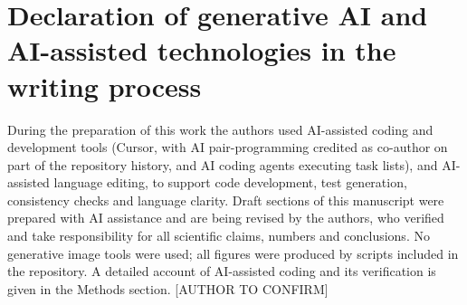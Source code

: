 
\section*{Declaration of generative AI and AI-assisted technologies in the writing process}

During the preparation of this work the authors used AI-assisted coding and
development tools (Cursor, with AI pair-programming credited as co-author on
part of the repository history, and AI coding agents executing task lists), and
AI-assisted language editing, to support code development, test generation,
consistency checks and language clarity. Draft sections of this manuscript were
prepared with AI assistance and are being revised by the authors, who verified
and take responsibility for all scientific claims, numbers and conclusions.
No generative image tools were used; all figures were produced by scripts
included in the repository. A detailed account of AI-assisted coding and its
verification is given in the Methods section. [AUTHOR TO CONFIRM]
